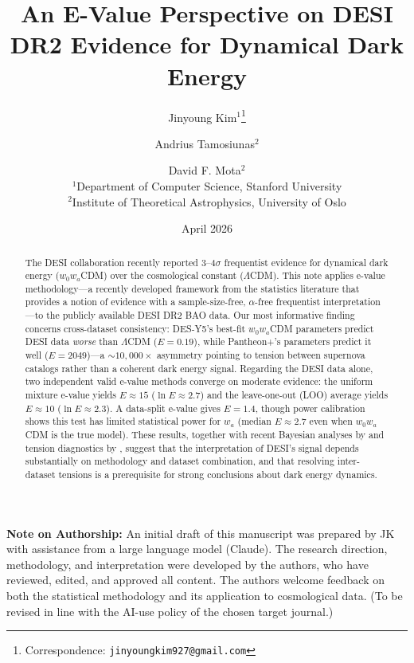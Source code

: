 \documentclass[11pt,a4paper]{article}
\title{An E-Value Perspective on DESI DR2 Evidence for Dynamical Dark Energy}
\author{
Jinyoung Kim$^{1}$\thanks{Correspondence: \texttt{jinyoungkim927@gmail.com}} \and
Andrius Tamosiunas$^{2}$ \and
David F. Mota$^{2}$\\[0.5em]
\small $^{1}$Department of Computer Science, Stanford University\\
\small $^{2}$Institute of Theoretical Astrophysics, University of Oslo
}
\date{April 2026}
\newcommand{\LCDM}{$\Lambda$CDM}
\begin{document}
\maketitle

\begin{abstract}
The DESI collaboration recently reported 3--4$\sigma$ frequentist evidence for dynamical dark energy ($w_0w_a$CDM) over the cosmological constant (\LCDM). This note applies e-value methodology---a recently developed framework from the statistics literature that provides a notion of evidence with a sample-size-free, $\alpha$-free frequentist interpretation---to the publicly available DESI DR2 BAO data. Our most informative finding concerns cross-dataset consistency: DES-Y5's best-fit $w_0w_a$CDM parameters predict DESI data \textit{worse} than \LCDM{} ($E = 0.19$), while Pantheon+'s parameters predict it well ($E = 2049$)---a ${\sim}10{,}000\times$ asymmetry pointing to tension between supernova catalogs rather than a coherent dark energy signal. Regarding the DESI data alone, two independent valid e-value methods converge on moderate evidence: the uniform mixture e-value yields $E \approx 15$ ($\ln E \approx 2.7$) and the leave-one-out (LOO) average yields $E \approx 10$ ($\ln E \approx 2.3$). A data-split e-value gives $E = 1.4$, though power calibration shows this test has limited statistical power for $w_a$ (median $E \approx 2.7$ even when $w_0w_a$CDM is the true model). These results, together with recent Bayesian analyses by \citet{OngBayesian2025} and tension diagnostics by \citet{WangMota2025}, suggest that the interpretation of DESI's signal depends substantially on methodology and dataset combination, and that resolving inter-dataset tensions is a prerequisite for strong conclusions about dark energy dynamics.
\end{abstract}

\vspace{1em}
\noindent\textbf{Note on Authorship:} An initial draft of this manuscript was prepared by JK with assistance from a large language model (Claude). The research direction, methodology, and interpretation were developed by the authors, who have reviewed, edited, and approved all content. The authors welcome feedback on both the statistical methodology and its application to cosmological data. (To be revised in line with the AI-use policy of the chosen target journal.)

\tableofcontents
\newpage

\end{document}

